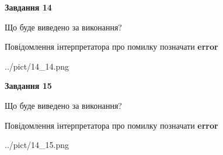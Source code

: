 \documentclass[11pt, ukrainian]{article}
\begin{document}
{\begin {large}
{\begin {center}\textbf{Завдання 14}\end {center}}\par
Що буде виведено за виконання? \par
Повідомлення інтерпретатора про помилку позначати \textbf{error}

\begin{center}
	{../pict/14_14.png}
\end{center}
\newpage

{\begin {center}\textbf{Завдання 15}\end {center}}\par
Що буде виведено за виконання? \par
Повідомлення інтерпретатора про помилку позначати \textbf{error}

\begin{center}
	{../pict/14_15.png}
\end{center}
\newpage

\end {large}}
\end{document}
